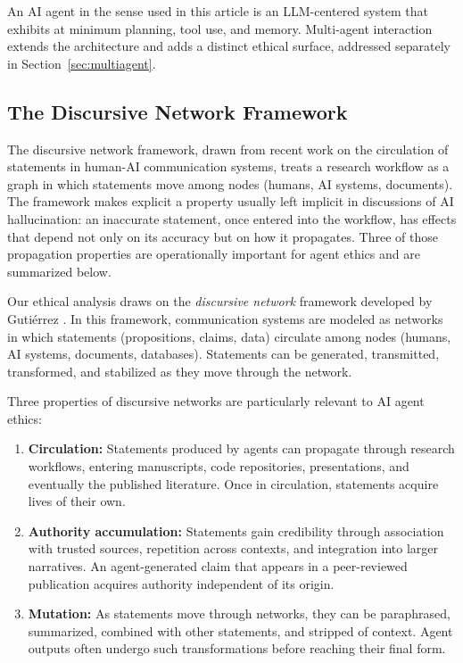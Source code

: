 \documentclass[11pt,letterpaper]{article}
\begin{document}
An AI agent in the sense used in this article is an LLM-centered system that exhibits at minimum planning, tool use, and memory. Multi-agent interaction extends the architecture and adds a distinct ethical surface, addressed separately in Section~\ref{sec:multiagent}.

\subsection{The Discursive Network Framework}

The discursive network framework, drawn from recent work on the circulation of statements in human-AI communication systems, treats a research workflow as a graph in which statements move among nodes (humans, AI systems, documents). The framework makes explicit a property usually left implicit in discussions of AI hallucination: an inaccurate statement, once entered into the workflow, has effects that depend not only on its accuracy but on how it propagates. Three of those propagation properties are operationally important for agent ethics and are summarized below.

Our ethical analysis draws on the \emph{discursive network} framework developed by Guti\'errez \cite{gutierrez2025}. In this framework, communication systems are modeled as networks in which statements (propositions, claims, data) circulate among nodes (humans, AI systems, documents, databases). Statements can be generated, transmitted, transformed, and stabilized as they move through the network.

Three properties of discursive networks are particularly relevant to AI agent ethics:

\begin{enumerate}[leftmargin=*]
    \item \textbf{Circulation:} Statements produced by agents can propagate through research workflows, entering manuscripts, code repositories, presentations, and eventually the published literature. Once in circulation, statements acquire lives of their own.
    
    \item \textbf{Authority accumulation:} Statements gain credibility through association with trusted sources, repetition across contexts, and integration into larger narratives. An agent-generated claim that appears in a peer-reviewed publication acquires authority independent of its origin.
    
    \item \textbf{Mutation:} As statements move through networks, they can be paraphrased, summarized, combined with other statements, and stripped of context. Agent outputs often undergo such transformations before reaching their final form.
\end{enumerate}
\end{document}
